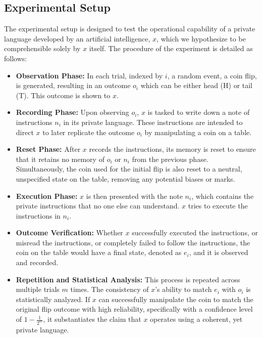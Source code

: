\documentclass[12pt]{article}
\begin{document}
\subsection{Experimental Setup}
The experimental setup is designed to test the operational capability of a private language developed by an artificial intelligence, \( x \), which we hypothesize to be comprehensible solely by \( x \) itself. The procedure of the experiment is detailed as follows:

\begin{itemize}
    \item \textbf{Observation Phase:} In each trial, indexed by \( i \), a random event, a coin flip, is generated, resulting in an outcome \( o_i \) which can be either head (H) or tail (T). This outcome is shown to \( x \).

    \item \textbf{Recording Phase:} Upon observing \( o_i \), \( x \) is tasked to write down a note of instructions \( n_i \) in its private language. These instructions are intended to direct \( x \) to later replicate the outcome \( o_i \) by manipulating a coin on a table.

    \item \textbf{Reset Phase:} After \( x \) records the instructions, its memory is reset to ensure that it retains no memory of \( o_i \) or \( n_i \) from the previous phase. Simultaneously, the coin used for the initial flip is also reset to a neutral, unspecified state on the table, removing any potential biases or marks.

    \item \textbf{Execution Phase:} \( x \) is then presented with the note \( n_i \), which contains the private instructions that no one else can understand. $x$ tries to execute the instructions in $n_i$.

    \item \textbf{Outcome Verification:} Whether $x$ successfully executed the instructions, or misread the instructions, or completely failed to follow the instructions, the coin on the table would have a final state, denoted as \( e_i \), and it is observed and recorded. 

    \item \textbf{Repetition and Statistical Analysis:} This process is repeated across multiple trials \( m \) times. The consistency of \( x \)'s ability to match \( e_i \) with \( o_i \) is statistically analyzed. If \( x \) can successfully manipulate the coin to match the original flip outcome with high reliability, specifically with a confidence level of \( 1 - \frac{1}{2^m} \), it substantiates the claim that \( x \) operates using a coherent, yet private language.
\end{itemize}
\end{document}
